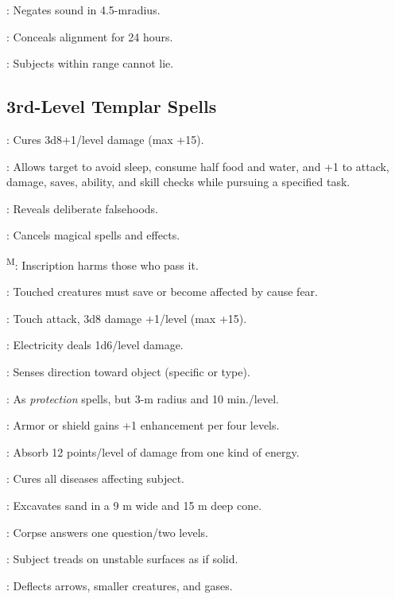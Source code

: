 : Negates sound in 4.5-mradius.

: Conceals alignment for 24 hours.

: Subjects within range cannot lie.



\subsection{3rd-Level Templar Spells}

: Cures 3d8+1/level damage (max +15).

: Allows target to avoid sleep, consume half food and water, and +1 to attack, damage, saves, ability, and skill checks while pursuing a specified task.

: Reveals deliberate falsehoods.

: Cancels magical spells and effects.

\textsuperscript{M}: Inscription harms those who pass it.

: Touched creatures must save or become affected by cause fear.

: Touch attack, 3d8 damage +1/level (max +15).

: Electricity deals 1d6/level damage.

: Senses direction toward object (specific or type).

: As \emph{protection} spells, but 3-m radius and 10 min./level.

: Armor or shield gains +1 enhancement per four levels.

: Absorb 12 points/level of damage from one kind of energy.

: Cures all diseases affecting subject.

: Excavates sand in a 9 m wide and 15 m deep cone.

: Corpse answers one question/two levels.

: Subject treads on unstable surfaces as if solid.

: Deflects arrows, smaller creatures, and gases.

